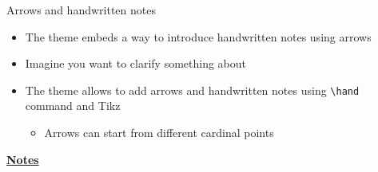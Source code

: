 \documentclass[10pt]{beamer}
\begin{document}
\begin{frame}[t]
    {Arrows and handwritten notes}\bigskip
    \begin{itemize}
        \item The theme embeds a way to introduce handwritten notes using arrows \bigskip\medskip
        \item Imagine you want to clarify something about  \bigskip\medskip
        \item The theme allows to add arrows and handwritten notes using \texttt{\textbackslash hand} command and Tikz \medskip
        \begin{itemize}
            \item Arrows can start from different cardinal points 
        \end{itemize}
    \end{itemize}
\end{frame}
\begin{flushleft}
    \underline{\textbf{Notes}}\setlength{\parskip}{.15cm}\notesize\newline\par
\end{flushleft}
\end{document}
